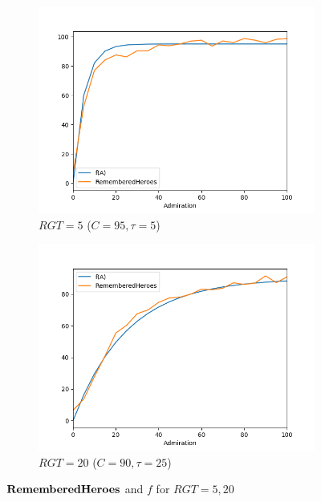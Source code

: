 \documentclass[a4paper,12pt]{article}
\begin{document}
\begin{figure}[h]
    \centering
    \begin{subfigure}[b]{0.4\linewidth} 
        \includegraphics[width=\linewidth]{f_rgt5}
        \caption{$RGT=5$ ($C=95,\tau=5$)}
    \end{subfigure}
    \begin{subfigure}[b]{0.4\linewidth}
        \includegraphics[width=\linewidth]{f_rgt20}
        \caption{$RGT=20$ ($C=90,\tau=25$)}
    \end{subfigure}
    \caption{$\bf{RememberedHeroes}$ and $f$ for $RGT=5, 20$}
    \label{fig:RGT5-20}
    \end{figure}
\end{document}
